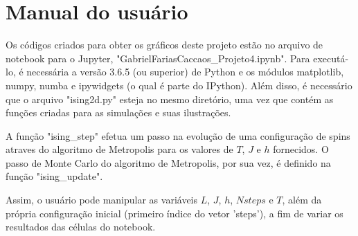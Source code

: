\section{Manual do usuário}

Os códigos criados para obter os gráficos deste projeto estão no arquivo de notebook para o Jupyter, "GabrielFariasCaccaos_Projeto4.ipynb". Para executá-lo, é necessária a versão 3.6.5 (ou superior) de Python e os módulos matplotlib, numpy, numba e ipywidgets (o qual é parte do IPython). Além disso, é necessário que o arquivo "ising2d.py" esteja no mesmo diretório, uma vez que contém as funções criadas para as simulações e suas ilustrações.

A função "ising_step" efetua um passo na evolução de uma configuração de spins atraves do algoritmo de Metropolis para os valores de $T$, $J$ e $h$ fornecidos. O passo de Monte Carlo do algoritmo de Metropolis, por sua vez, é definido na função "ising_update".

Assim, o usuário pode manipular as variáveis $L$, $J$, $h$, $Nsteps$ e $T$, além da própria configuração inicial (primeiro índice do vetor 'steps'), a fim de variar os resultados das células do notebook.